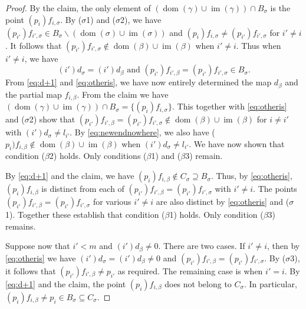 \documentclass[10pt,a4paper]{amsart}
\newcommand{\dom}{\operatorname{dom}}
\newcommand{\im}{\operatorname{im}}
\begin{document}
\begin{proof}
     By the claim, the only element of \((\dom(\gamma)\cup \im(\gamma))\cap B_\sigma \) is the point \((p_i)f_{i,\sigma}\).
     By ($\sigma$1) and ($\sigma$2), we have \((p_{i'})f_{i',\sigma}\in B_\sigma\backslash (\dom(\sigma)\cup \im(\sigma))\) and \((p_i)f_{i,\sigma}\neq (p_{i'})f_{i',\sigma}\) for \(i'\neq i\).
     It follows that \((p_{i'})f_{i',\sigma}\not\in \dom(\beta)\cup \im(\beta)\) when \(i'\neq i\). Thus when \(i'\neq i\), we have 
     \begin{equation}\tag{$***$}\label{eq:otheris}
     (i')d_\sigma =(i')d_\beta\text{ and }(p_{i'})f_{i',\beta}=(p_{i'})f_{i',\sigma}\in B_{\sigma}.
     \end{equation}
     From \cref{eq:d+1} and \cref{eq:otheris}, we have now entirely determined the map \(d_{\beta}\) and the partial map \(f_{i,\beta}\).
     From the claim we have \((\dom(\gamma)\cup \im(\gamma))\cap B_{\sigma}=\{(p_i)f_{i,\sigma}\}\). This together with \cref{eq:otheris} and ($\sigma$2) show that \((p_{i'})f_{i',\beta}=(p_{i'})f_{i',\sigma}\notin \dom(\beta)\cup \im(\beta)\) for \(i\neq i'\) with \((i')d_\sigma\neq l_{i'}\).
     By \cref{eq:newendnowhere}, we also have (\(p_{i})f_{i,\beta}\notin \dom(\beta)\cup \im(\beta)\) when \((i')d_\sigma\neq l_{i'}\). We have now shown that condition ($\beta$2) holds. 
     Only conditions ($\beta$1) and ($\beta$3) remain.
     
      By \cref{eq:d+1} and the claim, we have \((p_i)f_{i,\beta}\notin C_\sigma\supseteq B_\sigma\). Thus, by \cref{eq:otheris}, \((p_i)f_{i,\beta}\) is distinct from each of \((p_{i'})f_{i',\beta}=(p_{i'})f_{i',\sigma}\) with \(i'\neq i\). The points \((p_{i'})f_{i',\beta}=(p_{i'})f_{i',\sigma}\) for various \(i'\neq i\) are also distinct by \cref{eq:otheris} and ($\sigma$1). Together these establish that condition ($\beta$1) holds. Only condition ($\beta$3) remains.

     Suppose now that \(i'<m\) and \((i')d_\beta \neq 0\).
     There are two cases. If \(i'\neq i\), then by \cref{eq:otheris} we have \((i')d_\sigma=(i')d_\beta \neq 0\) and \((p_{i'})f_{i',\beta}=(p_{i'})f_{i',\sigma}\).
     By ($\sigma$3), it follows that  \((p_{i'})f_{i',\beta}\neq p_{i'}\) as required.
     The remaining case is when \(i'=i\). By \cref{eq:d+1} and the claim,
     the point \((p_i)f_{i,\beta}\) does not belong to \(C_\sigma\).
     In particular, \((p_i)f_{i,\beta}\neq p_i\in B_\sigma\subseteq C_\sigma\).
     
\end{proof}
\end{document}

